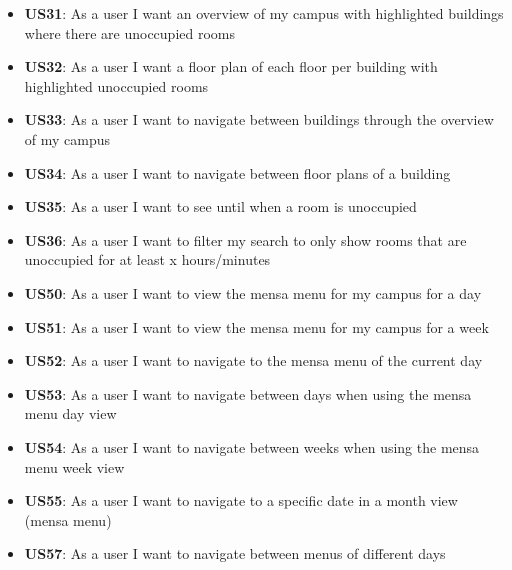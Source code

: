 \begin{markdown}
\begin{itemize}
  \item \textbf{US31}: As a user I want an overview of my campus with highlighted buildings where there are unoccupied rooms
  \item \textbf{US32}: As a user I want a floor plan of each floor per building with highlighted unoccupied rooms
  \item \textbf{US33}: As a user I want to navigate between buildings through the overview of my campus
  \item \textbf{US34}: As a user I want to navigate between floor plans of a building
  \item \textbf{US35}: As a user I want to see until when a room is unoccupied
  \item \textbf{US36}: As a user I want to filter my search to only show rooms that are unoccupied for at least x hours/minutes
  \item \textbf{US50}: As a user I want to view the mensa menu for my campus for a day
  \item \textbf{US51}: As a user I want to view the mensa menu for my campus for a week
  \item \textbf{US52}: As a user I want to navigate to the mensa menu of the current day
  \item \textbf{US53}: As a user I want to navigate between days when using the mensa menu day view
  \item \textbf{US54}: As a user I want to navigate between weeks when using the mensa menu week view
  \item \textbf{US55}: As a user I want to navigate to a specific date in a month view (mensa menu)
  \item \textbf{US57}: As a user I want to navigate between menus of different days
\end{itemize} 

\end{markdown}
